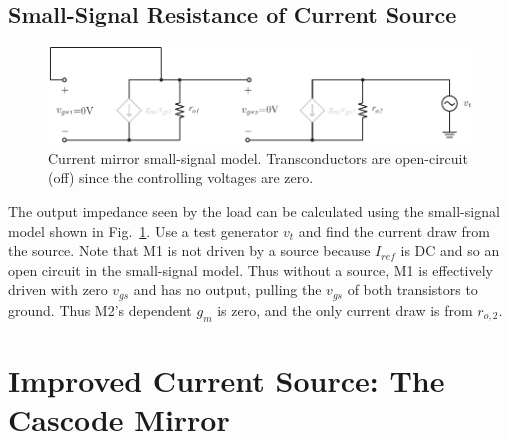 \subsection{Small-Signal Resistance of Current Source}
\begin{figure}[tb]
\centering
\includegraphics[scale=0.95]{8mirror_small_signal.pdf}
\caption{Current mirror small-signal model.  Transconductors are open-circuit (off) since the controlling voltages are zero.}
\label{fig:8mirror_small_signal.pdf}
\end{figure}
The output impedance seen by the load can be calculated using the small-signal model shown in Fig.~\ref{fig:8mirror_small_signal.pdf}.  Use a test generator $v_t$ and find the current draw from the source.  Note that M1 is not driven by a source because $I_{ref}$ is DC and so an open circuit in the small-signal model.  Thus without a source, M1 is effectively driven with zero $v_{gs}$ and has no output, pulling the $v_{gs}$ of both transistors to ground.  Thus M2's dependent $g_m$ is zero, and the only current draw is from $r_{o,2}$.
\section{Improved Current Source:  The Cascode Mirror}
